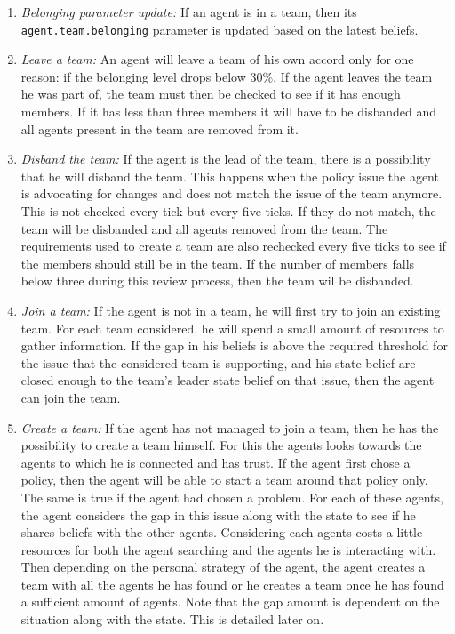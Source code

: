 \begin{enumerate}
\item \emph{Belonging parameter update:} If an agent is in a team, then its \texttt{agent.team.belonging} parameter is updated based on the latest beliefs. 
\item \emph{Leave a team:} An agent will leave a team of his own accord only for one reason: if the belonging level drops below 30\%. If the agent leaves the team he was part of, the team must then be checked to see if it has enough members. If it has less than three members it will have to be disbanded and all agents present in the team are removed from it.
\item \emph{Disband the team:} If the agent is the lead of the team, there is a possibility that he will disband the team. This happens when the policy issue the agent is advocating for changes and does not match the issue of the team anymore. This is not checked every tick but every five ticks. If they do not match, the team will be disbanded and all agents removed from the team. The requirements used to create a team are also rechecked every five ticks to see if the members should still be in the team. If the number of members falls below three during this review process, then the team wil be disbanded.
\item \emph{Join a team:} If the agent is not in a team, he will first try to join an existing team. For each team considered, he will spend a small amount of resources to gather information. If the gap in his beliefs is above the required threshold for the issue that the considered team is supporting, and his state belief are closed enough to the team's leader state belief on that issue, then the agent can join the team.
\item \emph{Create a team:} If the agent has not managed to join a team, then he has the possibility to create a team himself. For this the agents looks towards the agents to which he is connected and has trust. If the agent first chose a policy, then the agent will be able to start a team around that policy only. The same is true if the agent had chosen a problem. For each of these agents, the agent considers the gap in this issue along with the state to see if he shares beliefs with the other agents. Considering each agents costs a little resources for both the agent searching and the agents he is interacting with. Then depending on the personal strategy of the agent, the agent creates a team with all the agents he has found or he creates a team once he has found a sufficient amount of agents. Note that the gap amount is dependent on the situation along with the state. This is detailed later on.	
\end{enumerate}

